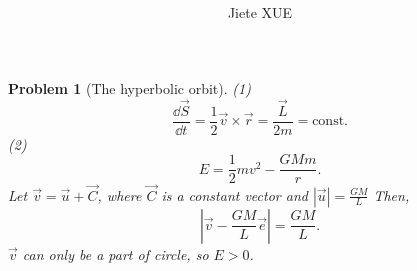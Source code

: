 \documentclass{article}
\title{\textbf{\mytitle}}
\author{Jiete XUE}
\date{\mydate}
\theoremstyle{1}
\newtheorem{problem}{Problem}
\begin{document}
\maketitle
\begin{problem}[The hyperbolic orbit]
    (1)\begin{equation}
        \frac{\dd{\vec{S}}}{\dd{t}}=\frac{1}{2}\vec{v}\times\vec{r}=\frac{\vec{L}}{2m}=\text{const.}
    \end{equation}
    (2)
        \begin{equation}
            E=\frac{1}{2}mv^2-\frac{GMm}{r}.
        \end{equation}
        Let $\vec{v}=\vec{u}+\vec{C}$, where $\vec{C}$ is a constant vector and $\left|\vec{u}\right|=\frac{GM}{L}$ Then,
    \begin{equation}
        \left|\vec{v}-\frac{GM}{L}\vec{e}\right|=\frac{GM}{L}.
    \end{equation}    
    $\vec{v}$ can only be a part of circle, so $E>0$.
    
\end{problem}
\end{document}
